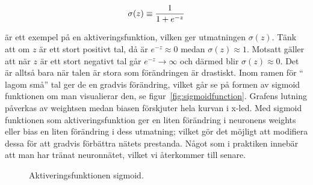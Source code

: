 \begin{equation} \label{eq:sigmoid}
	\sigma(z) \equiv \frac{1}{1 + e^{-z}} \\
\end{equation}

är ett exempel på en aktiveringsfunktion, vilken ger utmatningen
$\sigma(%
z)$.
Tänk att om $z$ är ett stort positivt tal, då är $e^{-z} \approx 0 $ medan
$\sigma(z) \approx 1$.
Motsatt gäller att när $z$ är ett stort negativt tal går $e^{-z} \rightarrow
\infty $ och därmed blir $\sigma(z) \approx 0$. Det är alltså bara när talen är
stora som förändringen är drastiskt. Inom ramen för `` lagom små'' tal ger de en
gradvis förändring, vilket går se på formen av sigmoid funktionen om man
visualierar den, se figur~\ref{fig:sigmoidfunction}. Grafens lutning påverkas av
weightsen medan biasen förskjuter hela kurvan i x-led.
Med sigmoid funktionen som aktiveringsfunktion ger en liten förändring i
neuronens weights eller bias en liten förändring i dess utmatning; vilket gör
det möjligt att modifiera dessa för att gradvis förbättra nätets prestanda.
Något som i praktiken innebär att man har tränat neuronnätet, vilket vi
återkommer till senare.


\begin{figure}
	\centering
	\caption{Aktiveringsfunktionen sigmoid. \label{fig:sigmoid}}
\end{figure}

